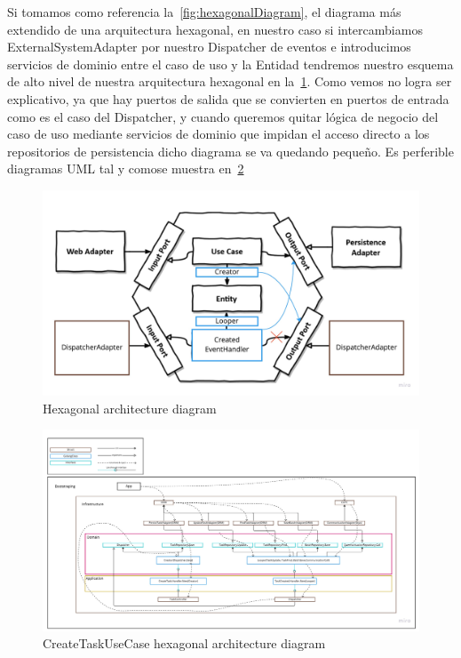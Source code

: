 
Si tomamos como referencia la~\cref{fig:hexagonalDiagram}, el diagrama más extendido de una arquitectura hexagonal, en nuestro caso si intercambiamos ExternalSystemAdapter por nuestro Dispatcher de eventos e introducimos servicios de dominio entre el caso de uso y la Entidad tendremos nuestro esquema de alto nivel de nuestra arquitectura hexagonal en la~\cref{fig:CreateTaskHexagonalDiagram}.
Como vemos no logra ser explicativo, ya que hay puertos de salida que se convierten en puertos de entrada como es el caso del Dispatcher, y cuando queremos quitar lógica de negocio del caso de uso mediante servicios de dominio que impidan el acceso directo a los repositorios de persistencia dicho diagrama se va quedando pequeño.
Es perferible diagramas UML tal y comose muestra en~\cref{fig:createTaskUseCaseArchitecture}

\begin{figure}[H]
    \centering
    \includegraphics[height=0.3\textheight]{./part/Ejecucion/Seguimiento/CreateTaskUseCase/img/CreateTaskHexagonalDiagram}
    \caption{Hexagonal architecture diagram}\label{fig:CreateTaskHexagonalDiagram}
\end{figure}

\begin{figure}[H]
    \centering
    \includegraphics[height=0.3\textheight]{./part/Ejecucion/Seguimiento/CreateTaskUseCase/img/createTaskUseCaseArchitecture}
    \caption{CreateTaskUseCase hexagonal architecture diagram}\label{fig:createTaskUseCaseArchitecture}
\end{figure}

